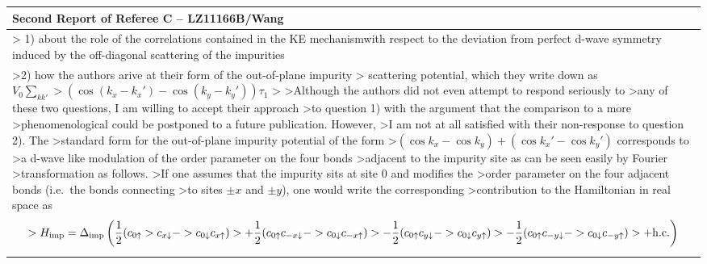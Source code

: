 \documentclass[11pt]{article}
\begin{document}
\begin{longtable}[]{@{}l@{}}
\toprule
\begin{minipage}[b]{0.96\columnwidth}\raggedright
Second Report of Referee C -- LZ11166B/Wang\strut
\end{minipage}\tabularnewline
\midrule
\endhead
\begin{minipage}[t]{0.96\columnwidth}\raggedright
\textgreater{} 1) about the role of the correlations contained in the KE
mechanismwith respect to the deviation from perfect d-wave symmetry
induced by the off-diagonal scattering of the impurities\strut
\end{minipage}\tabularnewline
\begin{minipage}[t]{0.96\columnwidth}\raggedright
\textgreater{}2) how the authors arive at their form of the out-of-plane
impurity \textgreater{} scattering potential, which they write down as
\(V_0 \sum_{kk'} > (\cos (k_x - k_x')-\cos(k_y - k_y')) \tau_1\)
\textgreater{} \textgreater{}Although the authors did not even attempt
to respond seriously to \textgreater{}any of these two questions, I am
willing to accept their approach \textgreater{}to question 1) with the
argument that the comparison to a more \textgreater{}phenomenological
could be postponed to a future publication. However, \textgreater{}I am
not at all satisfied with their non-response to question 2). The
\textgreater{}standard form for the out-of-plane impurity potential of
the form
\textgreater{}\((\cos k_x - \cos k_y) + (\cos k_x' - \cos k_y')\)
corresponds to \textgreater{}a d-wave like modulation of the order
parameter on the four bonds \textgreater{}adjacent to the impurity site
as can be seen easily by Fourier \textgreater{}transformation as
follows. \textgreater{}If one assumes that the impurity sits at site
\(0\) and modifies the \textgreater{}order parameter on the four
adjacent bonds (i.e.~the bonds connecting \textgreater{}to sites
\(\pm x\) and \(\pm y\)), one would write the corresponding
\textgreater{}contribution to the Hamiltonian in real space as
\begin{eqnarray}
>H_{\rm imp}=\Delta_{\rm imp} \left( \frac{1}{2} (c_{0 \uparrow}
>c_{x \downarrow} -
>                    c_{0 \downarrow} c_{x \uparrow})
>     + \frac{1}{2} (c_{0 \uparrow} c_{-x \downarrow} -
>                    c_{0 \downarrow} c_{-x \uparrow})
>     - \frac{1}{2} (c_{0 \uparrow} c_{y \downarrow} -
>                    c_{0 \downarrow} c_{y \uparrow})
>     - \frac{1}{2} (c_{0 \uparrow} c_{-y \downarrow} -
>                    c_{0 \downarrow} c_{-y \uparrow})
>     + {\rm h.c.} \right)

\end{eqnarray}
\end{minipage}
\end{longtable}
\end{document}
